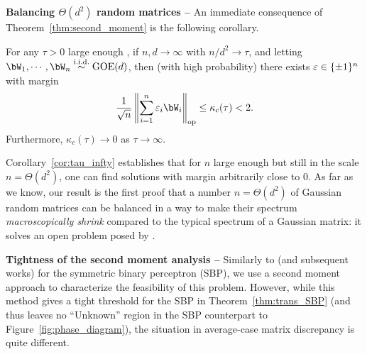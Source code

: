 \myskip
\textbf{Balancing $\Theta(d^2)$ random matrices -- }
An immediate consequence of Theorem~\ref{thm:second_moment} is the following corollary.
\begin{corollary}\label{cor:tau_infty}
    For any $\tau > 0$ large enough\footnotemark%
    , if $n,d \to \infty$ with $n / d^2 \to \tau$, and letting $\bW_1, \cdots, \bW_n \iid \GOE(d)$,
    then (with high probability) there exists $\varepsilon \in \{\pm 1\}^n$ with margin 
    \begin{equation*}
        \frac{1}{\sqrt{n}} \left\|\sum_{i=1}^n \eps_i \bW_i\right\|_\op \leq \kappa_c(\tau) < 2.
    \end{equation*}
    Furthermore, $\kappa_c(\tau) \to 0$ as $\tau \to \infty$.
\end{corollary}
\noindent
Corollary~\ref{cor:tau_infty} establishes that for $n$ large enough but still in the scale $n = \Theta(d^2)$, one can find solutions 
with margin arbitrarily close to $0$.
As far as we know, our result is the first proof that a number $n = \Theta(d^2)$ of Gaussian random matrices can be balanced in a way to make 
their spectrum \emph{macroscopically shrink} compared to the typical spectrum of a Gaussian matrix: it solves an open problem posed by \cite{kunisky2023online}.


\myskip
\textbf{Tightness of the second moment analysis --}
Similarly to \cite{aubin2019storage} (and subsequent works) for the symmetric binary perceptron (SBP), we use a second moment approach to characterize the feasibility of this problem.  
However, while this method gives a tight threshold for the SBP in Theorem~\ref{thm:trans_SBP} (and thus leaves no ``Unknown'' region in the SBP counterpart to Figure~\ref{fig:phase_diagram}),
the situation in average-case matrix discrepancy is quite different.


